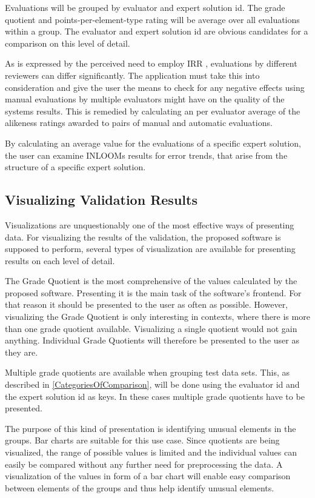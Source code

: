 Evaluations will be grouped by evaluator and expert solution id. The grade quotient and 
points-per-element-type rating will be average over all evaluations within a group. 
The evaluator and expert solution id are obvious candidates for a comparison on this level 
of detail. 

As is expressed by the perceived need to employ IRR \cite{28}, evaluations by different reviewers can 
differ significantly. The application must take this into consideration and give the user the 
means to check for any negative effects using manual evaluations by multiple evaluators might 
have on the quality of the systems results. This is remedied by calculating an per evaluator
average of the alikeness ratings awarded to pairs of manual and automatic evaluations.

By calculating an average value for the evaluations of a specific expert solution, the user 
can examine INLOOMs results for error trends, that arise from the structure of a specific 
expert solution. 



\subsection{Visualizing Validation Results}

Visualizations are unquestionably one of the most effective ways of presenting data. 
For visualizing the results of the validation, the proposed software is supposed to
perform, several types of visualization are available for presenting results on each
level of detail. 

The Grade Quotient is the most comprehensive of the values calculated by the proposed 
software. Presenting it is the main task of the software's frontend. For that reason
it should be presented to the user as often as possible. However, visualizing the 
Grade Quotient is only interesting in contexts, where there is more than one grade
quotient available. Visualizing a single quotient would not gain anything.
Individual Grade Quotients will therefore be presented to the user as they are. 

Multiple grade quotients are available when grouping test data sets. This, as described
in \ref{CategoriesOfComparison}, will be done using the evaluator id and the expert solution
id as keys. In these cases multiple grade quotients have to be presented. 

The purpose of this kind of presentation is identifying unusual elements in the groups. 
Bar charts are suitable for this use case. Since quotients are being visualized, the range
of possible values is limited and the individual values can easily be compared without any
further need for preprocessing the data. A visualization of the values in form of a bar chart
will enable easy comparison between elements of the groups and thus help identify unusual
elements.

